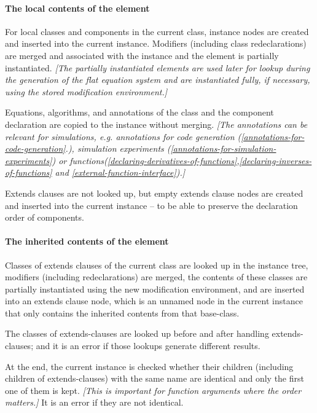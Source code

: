 \documentclass[10pt,a4paper]{report}
\def\doublelabel#1{\label{#1}}
\begin{document}
\paragraph{The local contents of the element}\doublelabel{the-local-contents-of-the-element}

For local classes and components in the current class, instance nodes
are created and inserted into the current instance. Modifiers (including
class redeclarations) are merged and associated with the instance and
the element is partially instantiated. \emph{{[}The partially
instantiated elements are used later for lookup during the generation of
the flat equation system and are instantiated fully, if necessary, using
the stored modification environment.{]}}

Equations, algorithms, and annotations of the class and the component
declaration are copied to the instance without merging. \emph{{[}The
annotations can be relevant for simulations, e.g. annotations for code
generation (\ref{annotations-for-code-generation}.), 
simulation experiments (\ref{annotations-for-simulation-experiments}) 
or functions(\ref{declaring-derivatives-of-functions},\ref{declaring-inverses-of-functions} and \ref{external-function-interface}).{]}}

Extends clauses are not looked up, but empty extends clause nodes are
created and inserted into the current instance -- to be able to preserve
the declaration order of components.

\paragraph{The inherited contents of the element}\doublelabel{the-inherited-contents-of-the-element}

Classes of extends clauses of the current class are looked up in the
instance tree, modifiers (including redeclarations) are merged, the
contents of these classes are partially instantiated using the new
modification environment, and are inserted into an extends clause node,
which is an unnamed node in the current instance that only contains the
inherited contents from that base-class.

The classes of extends-clauses are looked up before and after handling
extends-clauses; and it is an error if those lookups generate different
results.

At the end, the current instance is checked whether their children
(including children of extends-clauses) with the same name are identical
and only the first one of them is kept. \emph{{[}This is important for
function arguments where the order matters.{]}} It is an error if they
are not identical.
\end{document}
